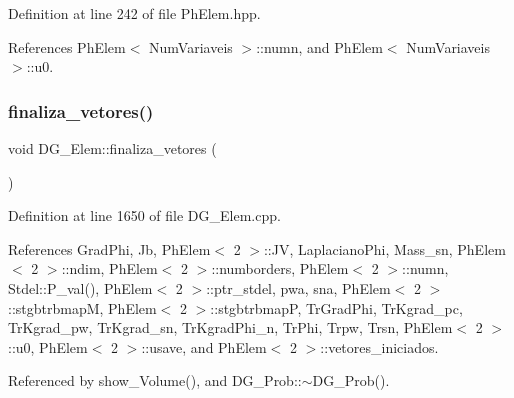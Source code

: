 Definition at line 242 of file Ph\+Elem.\+hpp.



References Ph\+Elem$<$ Num\+Variaveis $>$\+::numn, and Ph\+Elem$<$ Num\+Variaveis $>$\+::u0.

\mbox{\label{classDG__Elem_af91d2d61c97fae30b8dfc6db67433094}} 
\subsubsection{\texorpdfstring{finaliza\+\_\+vetores()}{finaliza\_vetores()}}
{\footnotesize\ttfamily void D\+G\+\_\+\+Elem\+::finaliza\+\_\+vetores (\begin{DoxyParamCaption}{ }\end{DoxyParamCaption})}



Definition at line 1650 of file D\+G\+\_\+\+Elem.\+cpp.



References Grad\+Phi, Jb, Ph\+Elem$<$ 2 $>$\+::\+JV, Laplaciano\+Phi, Mass\+\_\+sn, Ph\+Elem$<$ 2 $>$\+::ndim, Ph\+Elem$<$ 2 $>$\+::numborders, Ph\+Elem$<$ 2 $>$\+::numn, Stdel\+::\+P\+\_\+val(), Ph\+Elem$<$ 2 $>$\+::ptr\+\_\+stdel, pwa, sna, Ph\+Elem$<$ 2 $>$\+::stgbtrbmapM, Ph\+Elem$<$ 2 $>$\+::stgbtrbmapP, Tr\+Grad\+Phi, Tr\+Kgrad\+\_\+pc, Tr\+Kgrad\+\_\+pw, Tr\+Kgrad\+\_\+sn, Tr\+Kgrad\+Phi\+\_\+n, Tr\+Phi, Trpw, Trsn, Ph\+Elem$<$ 2 $>$\+::u0, Ph\+Elem$<$ 2 $>$\+::usave, and Ph\+Elem$<$ 2 $>$\+::vetores\+\_\+iniciados.



Referenced by show\+\_\+\+Volume(), and D\+G\+\_\+\+Prob\+::$\sim$\+D\+G\+\_\+\+Prob().

